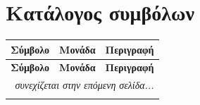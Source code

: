 
\section*{Κατάλογος συμβόλων}

{\renewcommand{\arraystretch}{1.25}

\noindent
\begin{longtable}{@{}p{3cm} p{2.3cm} p{9cm}@{}}
\toprule
\textbf{Σύμβολο} & \textbf{Μονάδα} & \textbf{Περιγραφή} \\
\midrule
\endfirsthead                             %

\toprule
\textbf{Σύμβολο} & \textbf{Μονάδα} & \textbf{Περιγραφή} \\
\midrule
\endhead                                  %

\midrule
\multicolumn{3}{r}{\emph{συνεχίζεται στην επόμενη σελίδα...}} \\
\endfoot                                  %

\bottomrule
\endlastfoot                              %


\end{longtable}}

